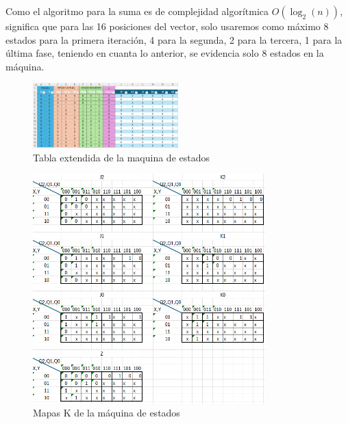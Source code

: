 \documentclass{article}
\begin{document}
Como el algoritmo para la suma es de complejidad algorítmica $O(\log_2(n))$, significa que para las 16 
posiciones del vector, solo usaremos como máximo 8 estados para la primera iteración, 4 para la segunda, 
2 para la tercera, 1 para la última fase, teniendo en cuanta lo anterior, se evidencia solo 8 estados 
en la máquina.
\begin{figure}[h] %
    \centering
    \includegraphics[width=0.5\textwidth]{imagenes/TABLA.png} %
    \caption{Tabla extendida de la maquina de estados} %
    \label{fig:tablaestados} %
\end{figure}
\begin{figure}[h] %
    \centering
    \includegraphics[width=0.8\textwidth]{imagenes/mapask_estados.png} %
    \caption{Mapas K de la máquina de estados} %
    \label{fig:mapaskestados} %
\end{figure}
\newpage
\end{document}
